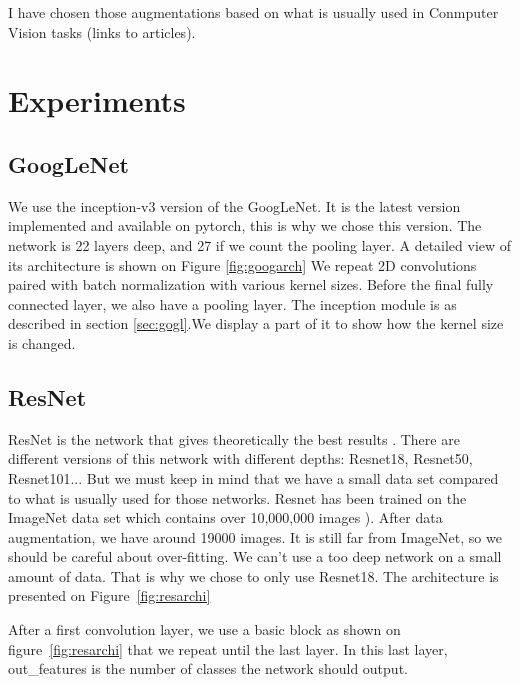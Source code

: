 I have chosen those augmentations based on what is usually used in Conmputer Vision tasks (links to articles).


\section{Experiments}
\subsection{GoogLeNet}
We use the inception-v3 version of the GoogLeNet. It is the latest version implemented and available on pytorch, this is why we chose this version. The network is 22 layers deep, and 27 if we count the pooling layer. A detailed view of its architecture is shown on Figure \ref{fig:googarch}
We repeat 2D convolutions paired with batch normalization with various kernel sizes. Before the final fully connected layer, we also have a pooling layer. The inception module is as described in section \ref{sec:gogl}.We display a part of it to show how the kernel size is changed.  
\subsection{ResNet}
ResNet is the network that gives theoretically the best results \cite{resnetpaper}. There are different versions of this network with different depths: Resnet18, Resnet50, Resnet101... But we must keep in mind that we have a small data set compared to what is usually used for those networks. Resnet has been trained on the ImageNet data set which contains over 10,000,000 images ). After data augmentation, we have around 19000 images. It is still far from ImageNet, so we should be careful about over-fitting. We can't use a too deep network on a small amount of data. That is why we chose to only use Resnet18. The architecture is presented on Figure~\ref{fig:resarchi}

After a first convolution layer, we use a basic block as shown on figure~\ref{fig:resarchi} that we repeat until the last layer. In this last layer, out\_features is the number of classes the network should output. 
